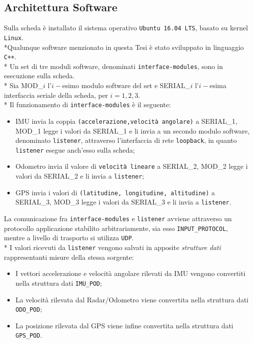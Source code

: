 \subsection{Architettura Software}
Sulla scheda \`e installato il sistema operativo \texttt{Ubuntu 16.04 LTS}, basato su kernel \texttt{Linux}.\\*Qualunque software menzionato in questa Tesi \`e stato sviluppato in linguaggio \texttt{C++}.\\*
Un set di tre moduli software, denominati \texttt{interface-modules}, sono in esecuzione sulla scheda.\\*
Sia MOD\_$i$ l'$i-$esimo modulo software del set e SERIAL\_$i$ l'$i-$esima interfaccia seriale della scheda, per $i = 1,2,3$.\\*
Il funzionamento di \texttt{interface-modules} \`e il seguente:\newpage
\begin{itemize}
	\item IMU invia la coppia \texttt{(accelerazione,velocit\`a angolare)} a SERIAL\_1, MOD\_1 legge i valori da SERIAL\_1 e li invia a un secondo modulo software, denominato \texttt{listener}, attraverso l'interfaccia di rete \texttt{loopback}, in quanto \texttt{listener} esegue anch'esso sulla scheda;
	\item Odometro invia il valore di \texttt{velocit\`a lineare} a SERIAL\_2, MOD\_2 legge i valori da SERIAL\_2 e li invia a \texttt{listener};
	\item GPS invia i valori di \texttt{(latitudine, longitudine, altitudine)} a SERIAL\_3, MOD\_3 legge i valori da SERIAL\_3 e li invia a \texttt{listener}.
\end{itemize}
La comunicazione fra \texttt{interface-modules} e \texttt{listener} avviene attraverso un protocollo applicazione stabilito arbitrariamente, sia esso \texttt{INPUT\_PROTOCOL}, mentre a livello di trasporto si utilizza \texttt{UDP}.\\*
I valori ricevuti da \texttt{listener} vengono salvati in apposite \emph{strutture dati} rappresentanti misure della stessa sorgente:
\begin{itemize}
\item I vettori accelerazione e velocit\`a angolare rilevati da IMU vengono convertiti nella struttura dati \texttt{IMU\_POD};
\item La velocit\`a rilevata dal Radar/Odometro viene convertita nella struttura dati \texttt{ODO\_POD};
\item La posizione rilevata dal GPS viene infine convertita nella struttura dati \texttt{GPS\_POD}.
\end{itemize}
